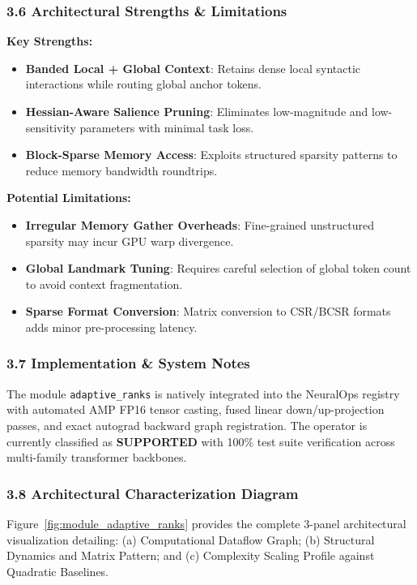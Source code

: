 \subsubsection*{3.6 Architectural Strengths \& Limitations}
\textbf{Key Strengths:}
\begin{itemize}
    \item \textbf{Banded Local + Global Context}: Retains dense local syntactic interactions while routing global anchor tokens.
    \item \textbf{Hessian-Aware Salience Pruning}: Eliminates low-magnitude and low-sensitivity parameters with minimal task loss.
    \item \textbf{Block-Sparse Memory Access}: Exploits structured sparsity patterns to reduce memory bandwidth roundtrips.
\end{itemize}

\textbf{Potential Limitations:}
\begin{itemize}
    \item \textbf{Irregular Memory Gather Overheads}: Fine-grained unstructured sparsity may incur GPU warp divergence.
    \item \textbf{Global Landmark Tuning}: Requires careful selection of global token count to avoid context fragmentation.
    \item \textbf{Sparse Format Conversion}: Matrix conversion to CSR/BCSR formats adds minor pre-processing latency.
\end{itemize}

\subsubsection*{3.7 Implementation \& System Notes}
The module \texttt{adaptive\_ranks} is natively integrated into the NeuralOps registry with automated AMP FP16 tensor casting, fused linear down/up-projection passes, and exact autograd backward graph registration. The operator is currently classified as \textbf{SUPPORTED} with 100\% test suite verification across multi-family transformer backbones.

\subsubsection*{3.8 Architectural Characterization Diagram}
Figure~\ref{fig:module_adaptive_ranks} provides the complete 3-panel architectural visualization detailing: (a) Computational Dataflow Graph; (b) Structural Dynamics and Matrix Pattern; and (c) Complexity Scaling Profile against Quadratic Baselines.

